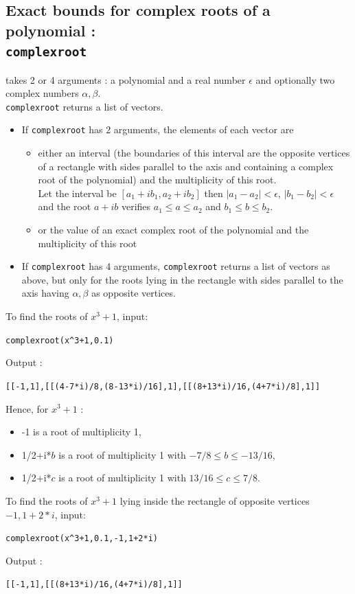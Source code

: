 \documentclass[a4paper,11pt]{book}
\begin{document}
\subsection{Exact bounds for complex roots of a polynomial :\\ 
{\tt complexroot}}
 takes 2 or 4 arguments : a polynomial and a real 
number $\epsilon$ and optionally two complex numbers $\alpha,\beta$.\\
{\tt complexroot} returns a list of vectors. 
\begin{itemize}
\item If {\tt complexroot} has 2 arguments, 
the elements of each vector are
\begin{itemize}
\item either an interval (the 
boundaries of this interval are the opposite vertices of a rectangle with sides
parallel to the axis and containing a complex root of the polynomial) and the 
multiplicity of this root.\\
Let the interval be $[a_1+ib_1,a_2+ib_2]$ then $|a_1-a_2|<\epsilon$,  
$|b_1-b_2|<\epsilon$ and the root $a+ib$ verifies 
$a_1\leq a \leq a_2$ and  $b_1\leq b \leq b_2$.
\item or the value of an exact complex root of 
the polynomial and the multiplicity of this root 
\end{itemize}
\item If {\tt complexroot} has 4 arguments, {\tt complexroot} returns a list of
vectors as above, but only for the roots lying in 
the rectangle with sides parallel to the axis having $\alpha,\beta$ as
opposite vertices.\\
\end{itemize}
To find the roots of $x^3+1$, input:
\begin{center}{\tt complexroot(x\verb|^|3+1,0.1)}\end{center}
Output :
\begin{center}{\tt [[-1,1],[[(4-7*i)/8,(8-13*i)/16],1],[[(8+13*i)/16,(4+7*i)/8],1]]}\end{center}
Hence, for  $x^3+1$ :
\begin{itemize}
\item -1 is a root of multiplicity 1, 
\item 1/2+i*$b$ is a root of  multiplicity 1 with  $-7/8\leq b \leq
  -13/16$, 
\item 1/2+i*$c$ is a root of multiplicity 1 with  $13/16\leq c \leq
  7/8$.
\end{itemize}
To find the roots of $x^3+1$ lying inside the rectangle 
of opposite vertices $-1,1+2*i$, input:
\begin{center}{\tt complexroot(x\verb|^|3+1,0.1,-1,1+2*i)}\end{center}
Output :
\begin{center}{\tt [[-1,1],[[(8+13*i)/16,(4+7*i)/8],1]]}\end{center} 
\end{document}
